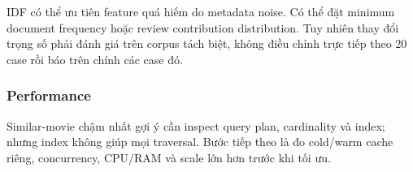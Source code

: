 IDF có thể ưu tiên feature quá hiếm do metadata noise. Có thể đặt minimum document
frequency hoặc review contribution distribution. Tuy nhiên thay đổi trọng số phải
đánh giá trên corpus tách biệt, không điều chỉnh trực tiếp theo 20 case rồi báo
trên chính các case đó.

\subsubsection{Performance}

Similar-movie chậm nhất gợi ý cần inspect query plan, cardinality và index; nhưng
index không giúp mọi traversal. Bước tiếp theo là đo cold/warm cache riêng,
concurrency, CPU/RAM và scale lớn hơn trước khi tối ưu.

